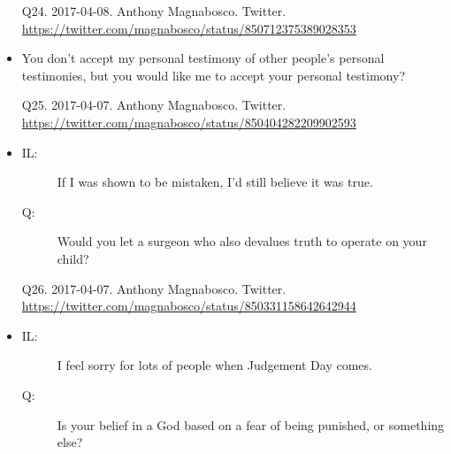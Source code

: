 \documentclass[a4paper]{scrartcl}
\begin{document}
\begin{itemize}
                \begin{tiny}
                    Q24.
                    2017-04-08.
                    Anthony Magnabosco.
                        Twitter.
                        \\
                        \url{ https://twitter.com/magnabosco/status/850712375389028353 }
                    \par
                \end{tiny}
                    \item You don't accept my personal testimony of other people's personal testimonies, but you would like me to accept your personal testimony?
                    
                \begin{tiny}
                    Q25.
                    2017-04-07.
                    Anthony Magnabosco.
                        Twitter.
                        \\
                        \url{ https://twitter.com/magnabosco/status/850404282209902593 }
                    \par
                \end{tiny}
                    \item
                    \begin{description}
                        \item[IL:] If I was shown to be mistaken, I'd still believe it was true.
                        \item[Q:] Would you let a surgeon who also devalues truth to operate on your child?
                    \end{description}
                    
                \begin{tiny}
                    Q26.
                    2017-04-07.
                    Anthony Magnabosco.
                        Twitter.
                        \\
                        \url{ https://twitter.com/magnabosco/status/850331158642642944 }
                    \par
                \end{tiny}
                    \item
                    \begin{description}
                        \item[IL:] I feel sorry for lots of people when Judgement Day comes.
                        \item[Q:] Is your belief in a God based on a fear of being punished, or something else?
                    \end{description}
                    

\end{itemize}
\end{document}
